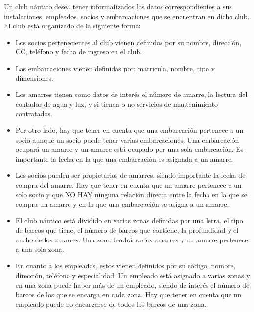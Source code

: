 Un club náutico desea tener informatizados los datos correspondientes a sus instalaciones, empleados, socios y embarcaciones que se encuentran en dicho club. El club está organizado de la siguiente forma:
\begin{itemize}
    \item Los socios pertenecientes al club vienen definidos por su nombre, dirección, CC, teléfono y fecha de ingreso en el club.
    \item Las embarcaciones vienen definidas por: matricula, nombre, tipo y dimensiones.
    \item Los amarres tienen como datos de interés el número de amarre, la lectura del contador de agua y luz, y si tienen o no servicios de mantenimiento contratados.
    \item Por otro lado, hay que tener en cuenta que una embarcación pertenece a un socio aunque un socio puede tener varias embarcaciones. Una embarcación ocupará un amarre y un amarre está ocupado por una sola embarcación. Es importante la fecha en la que una embarcación es asignada a un amarre.
    \item Los socios pueden ser propietarios de amarres, siendo importante la fecha de compra del amarre. Hay que tener en cuenta que un amarre pertenece a un solo socio y que NO HAY ninguna relación directa entre la fecha en la que se compra un amarre y en la que una embarcación se asigna a un amarre.
    \item El club náutico está dividido en varias zonas definidas por una letra, el tipo de barcos que tiene, el número de barcos que contiene, la profundidad y el ancho de los amarres. Una zona tendrá varios amarres y un amarre pertenece a una sola zona.
    \item En cuanto a los empleados, estos vienen definidos por su código, nombre, dirección, teléfono y especialidad. Un empleado está asignado a varias zonas y en una zona puede haber más de un empleado, siendo de interés el número de barcos de los que se encarga en cada zona. Hay que tener en cuenta que un empleado puede no encargarse de todos los barcos de una zona.
\end{itemize}